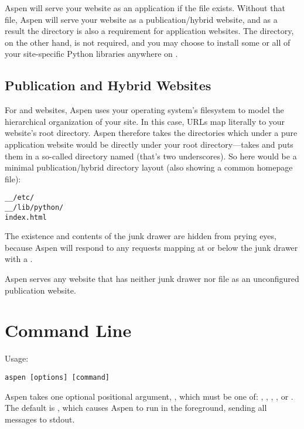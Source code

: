 Aspen will serve your website as an application if the file
 exists. Without that file, Aspen will serve your website
as a publication/hybrid website, and as a result the  directory is
also a requirement for application websites.  The  directory,
on the other hand, is not required, and you may choose to install some or all of
your site-specific Python libraries anywhere on .


\subsection{Publication and Hybrid Websites} \label{directories-pub-hybrid}

For  and  websites, Aspen uses your operating
system's filesystem to model the hierarchical organization of your site. In this
case, URLs map literally to your website's root directory. Aspen therefore takes
the directories which under a pure application website would be directly under
your root directory---takes and puts them in a so-called 
directory named \file{__} (that's two underscores). So here would be a minimal
publication/hybrid directory layout (also showing a common homepage file):

\begin{verbatim}
__/etc/
__/lib/python/
index.html
\end{verbatim}

The existence and contents of the junk drawer are hidden from prying eyes,
because Aspen will respond to any requests mapping at or below the junk drawer
with a .

Aspen serves any website that has neither junk drawer nor 
file as an unconfigured publication website.


\section{Command Line \label{command-line}}

Usage:

\begin{verbatim}
aspen [options] [command]
\end{verbatim}

Aspen takes one optional positional argument, , which must be one
of: , , , , or .
The default is , which causes Aspen to run in the foreground,
sending all messages to stdout.

